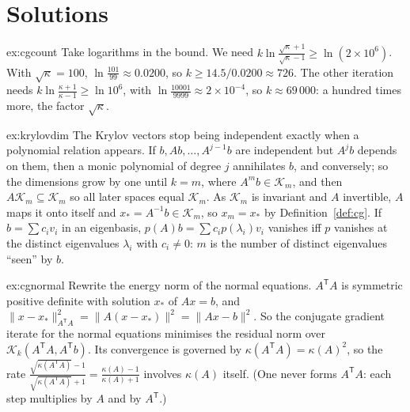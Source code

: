 \section{Solutions}

\begin{solution}{ex:cgcount}
\idea Take logarithms in the bound.
\writeup We need $k\ln\frac{\sqrt\kappa+1}{\sqrt\kappa-1}\ge\ln(2\times10^6)$. With $\sqrt\kappa=100$, $\ln\frac{101}{99}\approx0.0200$, so $k\ge14.5/0.0200\approx726$. The other iteration needs
$k\ln\frac{\kappa+1}{\kappa-1}\ge\ln10^6$, with $\ln\frac{10001}{9999}\approx2\times10^{-4}$, so $k\approx69\,000$: a hundred times more, the factor $\sqrt\kappa$.
\end{solution}

\begin{solution}{ex:krylovdim}
\idea The Krylov vectors stop being independent exactly when a polynomial relation appears.
\writeup If $b,Ab,\dots,A^{j-1}b$ are independent but $A^jb$ depends on them, then a monic polynomial of degree $j$ annihilates $b$, and conversely; so the dimensions grow by one until
$k=m$, where $A^mb\in\mathcal K_m$, and then $A\mathcal K_m\subseteq\mathcal K_m$ so all later spaces equal $\mathcal K_m$. As $\mathcal K_m$ is invariant and $A$ invertible, $A$ maps it onto itself
and $x_*=A^{-1}b\in\mathcal K_m$, so $x_m=x_*$ by Definition~\ref{def:cg}. If $b=\sum c_iv_i$ in an eigenbasis, $p(A)b=\sum c_ip(\lambda_i)v_i$ vanishes iff $p$ vanishes at the distinct
eigenvalues $\lambda_i$ with $c_i\ne0$: $m$ is the number of distinct eigenvalues ``seen'' by $b$.
\end{solution}

\begin{solution}{ex:cgnormal}
\idea Rewrite the energy norm of the normal equations.
\writeup $A^{\mathsf T}A$ is symmetric positive definite with solution $x_*$ of $Ax=b$, and $\|x-x_*\|^2_{A^{\mathsf T}A}=\|A(x-x_*)\|^2=\|Ax-b\|^2$. So the conjugate gradient iterate for the normal
equations minimises the residual norm over $\mathcal K_k(A^{\mathsf T}A,A^{\mathsf T}b)$. Its convergence is governed by $\kappa(A^{\mathsf T}A)=\kappa(A)^2$, so the rate
$\frac{\sqrt{\kappa(A^{\mathsf T}A)}-1}{\sqrt{\kappa(A^{\mathsf T}A)}+1}=\frac{\kappa(A)-1}{\kappa(A)+1}$ involves $\kappa(A)$ itself. (One never forms $A^{\mathsf T}A$: each step multiplies by $A$ and by
$A^{\mathsf T}$.)
\end{solution}

